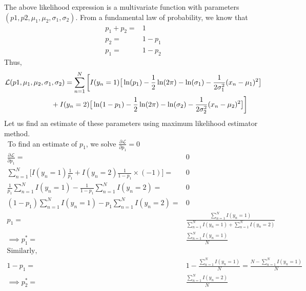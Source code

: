 \documentclass[letterpaper,doc,notimes]{apa6}
\begin{document}
{The above likelihood expression is a multivariate function with parameters $(p1, p2, \mu_1, \mu_2, \sigma_1, \sigma_2 )$.
From a fundamental law of probability, we know that
\begin{align*}
	p_1 + p_2 = & 1\\
	 p_2 = & 1 - p_1 \\
	 p_1 = & 1 - p_2
\end{align*}
Thus,
\begin{multline}
	\mathcal{L} (p1, \mu_1, \mu_2, \sigma_1, \sigma_2 )	=  \sum_{n=1}^{N}\bigg[
	I(y_n=1)\big[ \ln(p_1) -\frac{1}{2}\ln(2\pi) - \ln(\sigma_1) - \frac{1}{2\sigma_1^2} (x_n-\mu_1)^2 \big] \\
		\indent \indent \indent + 
	I(y_n=2)\big[ \ln(1 - p_1) -\frac{1}{2}\ln(2\pi) - \ln(\sigma_2) - \frac{1}{2\sigma_2^2} (x_n-\mu_2)^2 \big] \bigg] \\
\end{multline}
Let us find an estimate of these parameters using maximum likelihood estimator method.\\\
To find an estimate of $p_1$, we solve $\frac{\partial \mathcal{L} }{\partial p_1} = 0$
\begin{align*}
\frac{\partial \mathcal{L} }{\partial p_1} =& 0 \\
\sum_{n=1}^{N}\big[I(y_n=1)\frac{1}{p_1}  + I(y_n=2)\frac{1}{1-p_1} \times(-1) \big]  =& 0 \\ 
\frac{1}{p_1} \sum_{n=1}^{N} I(y_n=1)  - \frac{1}{1-p_1} \sum_{n=1}^{N} I(y_n=2) =& 0 \\ 
(1-p_1) \sum_{n=1}^{N} I(y_n=1)  - p_1 \sum_{n=1}^{N} I(y_n=2) =& 0 \\ 
p_1 =&  \frac{\sum_{n=1}^{N} I(y_n=1) }{\sum_{n=1}^{N} I(y_n=1) + \sum_{n=1}^{N} I(y_n=2)}\\ 
\implies p_1^* =&  \frac{\sum_{n=1}^{N} I(y_n=1) }{N} \\ 
\text{Similarly,} \\
1 - p_1 =& 1 - \frac{\sum_{n=1}^{N} I(y_n=1) }{N} = \frac{N - \sum_{n=1}^{N} I(y_n=1) }{N} \\ 
\implies p_2^* =&  \frac{\sum_{n=1}^{N} I(y_n=2) }{N} \\ 
\end{align*}

}
\end{document}
